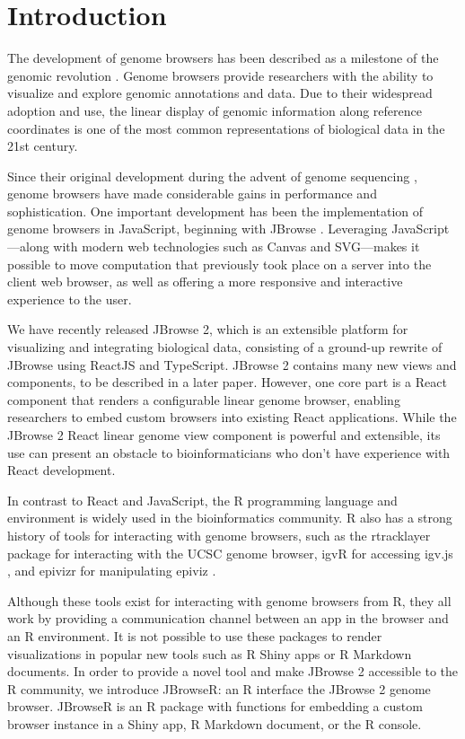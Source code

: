 \documentclass{bioinfo}
\begin{document}
\section{Introduction}

The development of genome browsers has been described as a milestone of
the genomic revolution \citep{packer2007clickable}. Genome browsers
provide researchers with the ability to visualize and explore genomic
annotations and data. Due to their widespread adoption and use, the
linear display of genomic information along reference coordinates is one
of the most common representations of biological data in the 21st
century.

Since their original development during the advent of genome sequencing
\citep{kent2002human, birney2004overview}, genome browsers have made
considerable gains in performance and sophistication. One important
development has been the implementation of genome browsers in
JavaScript, beginning with JBrowse \citep{buels2016jbrowse}. Leveraging
JavaScript---along with modern web technologies such as Canvas and
SVG---makes it possible to move computation that previously took place
on a server into the client web browser, as well as offering a more
responsive and interactive experience to the user.

We have recently released JBrowse 2, which is an extensible platform for
visualizing and integrating biological data, consisting of a ground-up
rewrite of JBrowse using ReactJS and TypeScript. JBrowse 2 contains many
new views and components, to be described in a later paper. However, one
core part is a React component that renders a configurable linear genome
browser, enabling researchers to embed custom browsers into existing
React applications. While the JBrowse 2 React linear genome view
component is powerful and extensible, its use can present an obstacle to
bioinformaticians who don't have experience with React development.

In contrast to React and JavaScript, the R programming language and
environment is widely used in the bioinformatics community. R also has a
strong history of tools for interacting with genome browsers, such as
the rtracklayer \citep{lawrence2009rtracklayer} package for interacting
with the UCSC genome browser, igvR for accessing igv.js
\citep{robinson2011integrative, robinson2017variant}, and epivizr for
manipulating epiviz \citep{chelaru2014epiviz}.

Although these tools exist for interacting with genome browsers from R,
they all work by providing a communication channel between an app in the
browser and an R environment. It is not possible to use these packages
to render visualizations in popular new tools such as R Shiny apps or R
Markdown documents. In order to provide a novel tool and make JBrowse 2
accessible to the R community, we introduce JBrowseR: an R interface the
JBrowse 2 genome browser. JBrowseR is an R package with functions for
embedding a custom browser instance in a Shiny app, R Markdown document,
or the R console.
\end{document}
